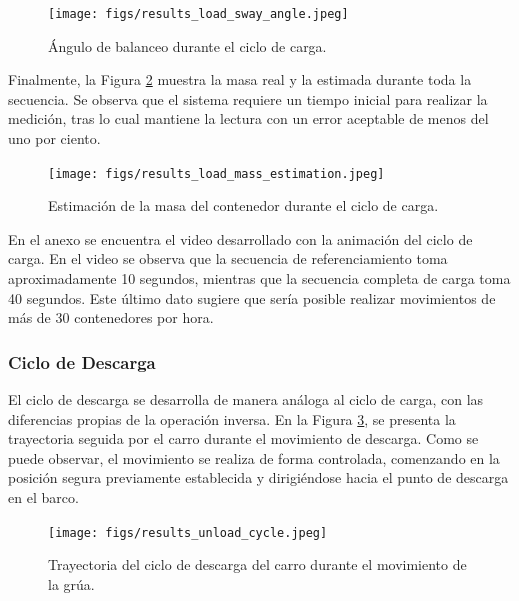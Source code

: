 \documentclass{article}
\begin{document}
            \begin{figure} [H]
                \centering
                \texttt{[image: figs/results\_load\_sway\_angle.jpeg]}
                \caption{Ángulo de balanceo durante el ciclo de carga.}
                \label{fig:results_load_sway_angle}
            \end{figure}

            Finalmente, la Figura \ref{fig:results_load_mass_estimation} muestra la masa real y la estimada durante toda la secuencia. Se observa que el sistema requiere un tiempo inicial para realizar la medición, tras lo cual mantiene la lectura con un error aceptable de menos del uno por ciento.

            \begin{figure} [H]
                \centering
                \texttt{[image: figs/results\_load\_mass\_estimation.jpeg]}
                \caption{Estimación de la masa del contenedor durante el ciclo de carga.}
                \label{fig:results_load_mass_estimation}
            \end{figure}

            En el anexo se encuentra el video desarrollado con la animación del ciclo de carga. En el video se observa que la secuencia de referenciamiento toma aproximadamente 10 segundos, mientras que la secuencia completa de carga toma 40 segundos. Este último dato sugiere que sería posible realizar movimientos de más de 30 contenedores por hora.


            \subsubsection{Ciclo de Descarga}

            El ciclo de descarga se desarrolla de manera análoga al ciclo de carga, con las diferencias propias de la operación inversa. En la Figura \ref{fig:results_unload_cycle}, se presenta la trayectoria seguida por el carro durante el movimiento de descarga. Como se puede observar, el movimiento se realiza de forma controlada, comenzando en la posición segura previamente establecida y dirigiéndose hacia el punto de descarga en el barco.

            \begin{figure} [H]
                \centering
                \texttt{[image: figs/results\_unload\_cycle.jpeg]}
                \caption{Trayectoria del ciclo de descarga del carro durante el movimiento de la grúa.}
                \label{fig:results_unload_cycle}
            \end{figure}
\end{document}
